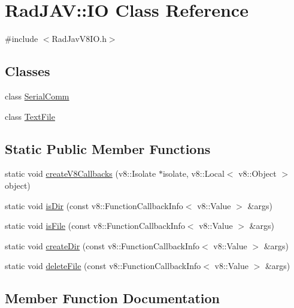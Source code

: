 \hypertarget{class_rad_j_a_v_1_1_i_o}{}\section{Rad\+J\+AV\+:\+:IO Class Reference}
\label{class_rad_j_a_v_1_1_i_o}


{\ttfamily \#include $<$Rad\+Jav\+V8\+I\+O.\+h$>$}

\subsection*{Classes}
\begin{DoxyCompactItemize}
\item 
class \mbox{\hyperlink{class_rad_j_a_v_1_1_i_o_1_1_serial_comm}{Serial\+Comm}}
\item 
class \mbox{\hyperlink{class_rad_j_a_v_1_1_i_o_1_1_text_file}{Text\+File}}
\end{DoxyCompactItemize}
\subsection*{Static Public Member Functions}
\begin{DoxyCompactItemize}
\item 
static void \mbox{\hyperlink{class_rad_j_a_v_1_1_i_o_ae48cb9566451e8fb3b77456db7f4dca4}{create\+V8\+Callbacks}} (v8\+::\+Isolate $\ast$isolate, v8\+::\+Local$<$ v8\+::\+Object $>$ object)
\item 
static void \mbox{\hyperlink{class_rad_j_a_v_1_1_i_o_a559602bb89c785eb95b591aeb94d8869}{is\+Dir}} (const v8\+::\+Function\+Callback\+Info$<$ v8\+::\+Value $>$ \&args)
\item 
static void \mbox{\hyperlink{class_rad_j_a_v_1_1_i_o_a083b7b7d98eb34c8096fe1164c0b1cd7}{is\+File}} (const v8\+::\+Function\+Callback\+Info$<$ v8\+::\+Value $>$ \&args)
\item 
static void \mbox{\hyperlink{class_rad_j_a_v_1_1_i_o_acf497bc03781e5fd6e942c5255afa2c2}{create\+Dir}} (const v8\+::\+Function\+Callback\+Info$<$ v8\+::\+Value $>$ \&args)
\item 
static void \mbox{\hyperlink{class_rad_j_a_v_1_1_i_o_a594342dee1c500ba7b1fd7f40b211858}{delete\+File}} (const v8\+::\+Function\+Callback\+Info$<$ v8\+::\+Value $>$ \&args)
\end{DoxyCompactItemize}


\subsection{Member Function Documentation}
\mbox{\label{class_rad_j_a_v_1_1_i_o_acf497bc03781e5fd6e942c5255afa2c2}} 
